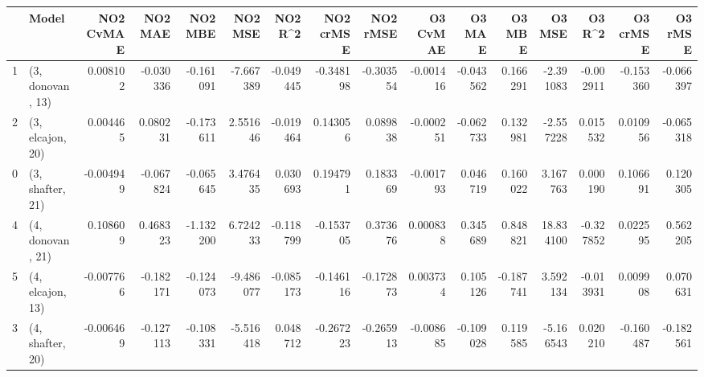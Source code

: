 \begin{tabular}{llrrrrrrrrrrrrrr}
\toprule
{} &             Model &  NO2 CvMAE &   NO2 MAE &   NO2 MBE &   NO2 MSE &   NO2 R\textasciicircum2 &  NO2 crMSE &  NO2 rMSE &  O3 CvMAE &    O3 MAE &    O3 MBE &     O3 MSE &    O3 R\textasciicircum2 &  O3 crMSE &   O3 rMSE \\
\midrule
1 &  (3, donovan, 13) &   0.008102 & -0.030336 & -0.161091 & -7.667389 & -0.049445 &  -0.348198 & -0.303554 & -0.001416 & -0.043562 &  0.166291 &  -2.391083 & -0.002911 & -0.153360 & -0.066397 \\
2 &  (3, elcajon, 20) &   0.004465 &  0.080231 & -0.173611 &  2.551646 & -0.019464 &   0.143056 &  0.089838 & -0.000251 & -0.062733 &  0.132981 &  -2.557228 &  0.015532 &  0.010956 & -0.065318 \\
0 &  (3, shafter, 21) &  -0.004949 & -0.067824 & -0.065645 &  3.476435 &  0.030693 &   0.194791 &  0.183369 & -0.001793 &  0.046719 &  0.160022 &   3.167763 &  0.000190 &  0.106691 &  0.120305 \\
4 &  (4, donovan, 21) &   0.108609 &  0.468323 & -1.132200 &  6.724233 & -0.118799 &  -0.153705 &  0.373676 &  0.000838 &  0.345689 &  0.848821 &  18.834100 & -0.327852 &  0.022595 &  0.562205 \\
5 &  (4, elcajon, 13) &  -0.007766 & -0.182171 & -0.124073 & -9.486077 & -0.085173 &  -0.146116 & -0.172873 &  0.003734 &  0.105126 & -0.187741 &   3.592134 & -0.013931 &  0.009908 &  0.070631 \\
3 &  (4, shafter, 20) &  -0.006469 & -0.127113 & -0.108331 & -5.516418 &  0.048712 &  -0.267223 & -0.265913 & -0.008685 & -0.109028 &  0.119585 &  -5.166543 &  0.020210 & -0.160487 & -0.182561 \\
\bottomrule
\end{tabular}
